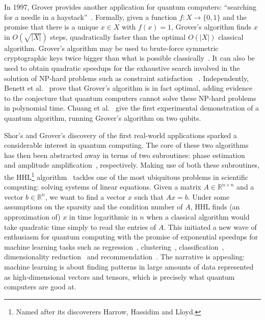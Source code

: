 In 1997, Grover provides another application for quantum computers:
``searching for a needle in a haystack''~\cite{Grover97}. Formally,
given a function $f : X \to \{0, 1\}$ and the promise that
there is a unique $x \in X$ with $f(x) = 1$, Grover's algorithm finds
$x$ in $O(\sqrt{|X|})$ steps, quadratically faster than the optimal
$O(|X|)$ classical algorithm. Grover's algorithm may be used to
brute-force symmetric cryptographic keys twice bigger than what is
possible classically~\cite{BernsteinEtAl09}. It can also be used to
obtain quadratic speedups for the exhaustive search involved in the
solution of NP-hard problems such as constraint satisfaction
~\cite{Ambainis04}. Independently, Benett et al.~\cite{BennettEtAl97}
prove that Grover's algorithm is in fact optimal, adding evidence to the
conjecture that quantum computers cannot solve these NP-hard problems in
polynomial time. Chuang et al.~\cite{ChuangEtAl98} give
the first experimental demonstration of a quantum algorithm, running
Grover's algorithm on two qubits.

Shor's and Grover's discovery of the first real-world applications
sparked a considerable interest in quantum computing. The core of these
two algorithms has then been abstracted away in terms of two
subroutines: phase estimation~\cite{Kitaev95} and amplitude
amplification~\cite{BrassardEtAl02}, respectively. Making use of both
these subroutines, the
HHL\footnote{Named after its discoverers Harrow, Hassidim and Lloyd.}
algorithm~\cite{HarrowEtAl09} tackles one of
the most ubiquitous problems in scientific computing: solving systems of linear
equations. Given a matrix $A \in \mathbb{R}^{n \times n}$ and a vector
${b} \in \mathbb{R}^{n}$, we want to find a vector ${x}$ such that
$A {x} = {b}$. Under some assumptions on the sparsity and the condition
number of $A$, HHL finds (an approximation of) $x$ in time logarithmic in $n$
when a classical algorithm would take quadratic time simply to read the entries
of $A$. This initiated a new wave of enthusiasm for quantum computing
with the promise of exponential speedups for machine learning tasks such as
regression~\cite{WiebeEtAl12}, clustering~\cite{LloydEtAl13},
classification~\cite{RebentrostEtAl14}, dimensionality
reduction~\cite{LloydEtAl14a} and recommendation~\cite{KerenidisPrakash16}.
The narrative is appealing: machine learning is about finding patterns
in large amounts of data represented as high-dimensional vectors and tensors,
which is precisely what quantum computers are good at.

